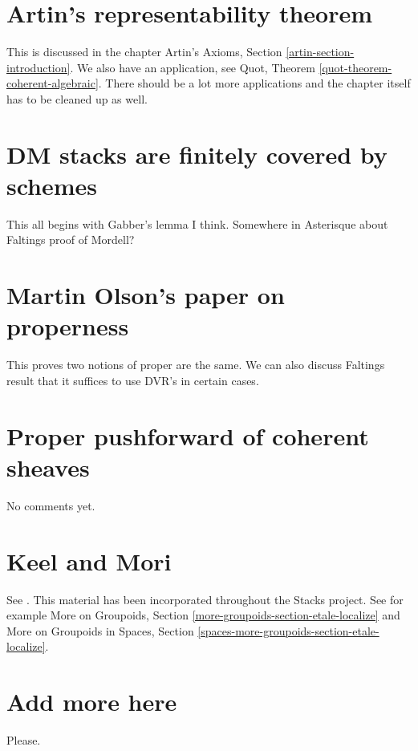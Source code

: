\section{Artin's representability theorem}
\label{section-representability}

\noindent
This is discussed in the chapter
Artin's Axioms, Section \ref{artin-section-introduction}.
We also have an application, see
Quot, Theorem \ref{quot-theorem-coherent-algebraic}.
There should be a lot more applications and the chapter
itself has to be cleaned up as well.


\section{DM stacks are finitely covered by schemes}
\label{section-dm-finite-cover}

\noindent
This all begins with Gabber's lemma I think. Somewhere in Asterisque about
Faltings proof of Mordell?


\section{Martin Olson's paper on properness}
\label{section-proper-parametrization}

\noindent
This proves two notions of proper are the same. We can also discuss Faltings
result that it suffices to use DVR's in certain cases.


\section{Proper pushforward of coherent sheaves}
\label{section-proper-pushforward}

\noindent
No comments yet.


\section{Keel and Mori}
\label{section-keel-mori}

\noindent
See \cite{K-M}. This material has been incorporated throughout the
Stacks project. See for example
More on Groupoids, Section \ref{more-groupoids-section-etale-localize}
and
More on Groupoids in Spaces, Section
\ref{spaces-more-groupoids-section-etale-localize}.


\section{Add more here}
\label{section-add-more}

\noindent
Please.









